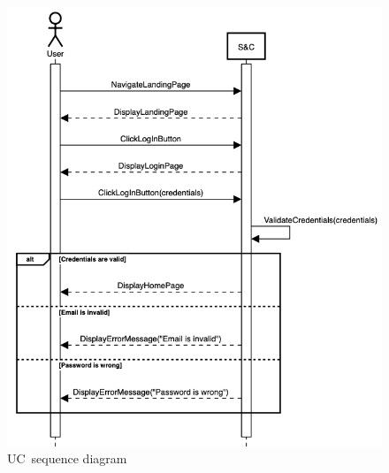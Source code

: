 \begin{figure}
    \centering
    \includegraphics[width=12cm]{images/sequence-diagrams/user-logs-in.png}
    \caption{UC\theuc\ sequence diagram}
\end{figure}


